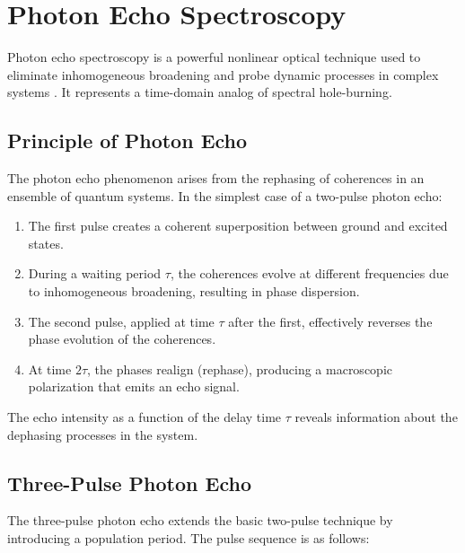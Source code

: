 
\section{Photon Echo Spectroscopy}
\label{sec:photon_echo}

\noindent Photon echo spectroscopy is a powerful nonlinear optical technique used to eliminate inhomogeneous broadening and probe dynamic processes in complex systems \cite{Hybl1998, Mukamel1995}. It represents a time-domain analog of spectral hole-burning.

\subsection{Principle of Photon Echo}
\label{subsec:echo_principle}

\noindent The photon echo phenomenon arises from the rephasing of coherences in an ensemble of quantum systems. In the simplest case of a two-pulse photon echo:

\begin{enumerate}
    \item The first pulse creates a coherent superposition between ground and excited states.
    \item During a waiting period $\tau$, the coherences evolve at different frequencies due to inhomogeneous broadening, resulting in phase dispersion.
    \item The second pulse, applied at time $\tau$ after the first, effectively reverses the phase evolution of the coherences.
    \item At time $2\tau$, the phases realign (rephase), producing a macroscopic polarization that emits an echo signal.
\end{enumerate}

\noindent The echo intensity as a function of the delay time $\tau$ reveals information about the dephasing processes in the system.

\subsection{Three-Pulse Photon Echo}
\label{subsec:three_pulse_echo}

\noindent The three-pulse photon echo extends the basic two-pulse technique by introducing a population period. The pulse sequence is as follows:

